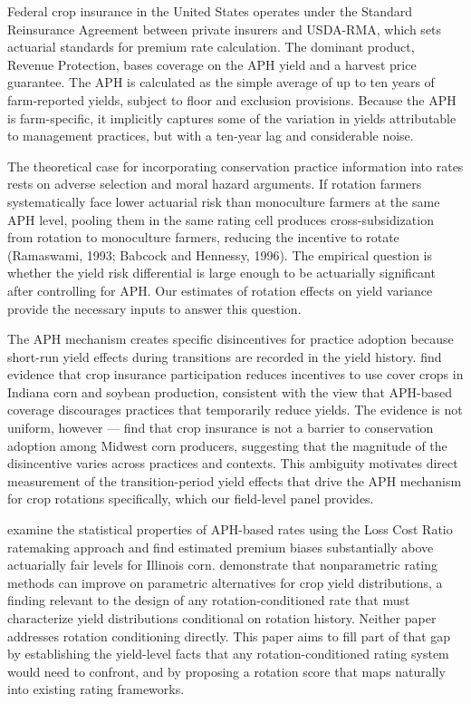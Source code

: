 \documentclass[11pt,letterpaper]{article}
\theoremstyle{remark}
\theoremstyle{plain}
\theoremstyle{definition}
\begin{document}
Federal crop insurance in the United States operates under the Standard Reinsurance Agreement between private insurers and USDA-RMA, which sets actuarial standards for premium rate calculation. The dominant product, Revenue Protection, bases coverage on the APH yield and a harvest price guarantee. The APH is calculated as the simple average of up to ten years of farm-reported yields, subject to floor and exclusion provisions. Because the APH is farm-specific, it implicitly captures some of the variation in yields attributable to management practices, but with a ten-year lag and considerable noise.

The theoretical case for incorporating conservation practice information into rates rests on adverse selection and moral hazard arguments. If rotation farmers systematically face lower actuarial risk than monoculture farmers at the same APH level, pooling them in the same rating cell produces cross-subsidization from rotation to monoculture farmers, reducing the incentive to rotate (Ramaswami, 1993; Babcock and Hennessy, 1996). The empirical question is whether the yield risk differential is large enough to be actuarially significant after controlling for APH. Our estimates of rotation effects on yield variance provide the necessary inputs to answer this question.

The APH mechanism creates specific disincentives for practice adoption because short-run yield effects during transitions are recorded in the yield history. \cite{Connor2022} find evidence that crop insurance participation reduces incentives to use cover crops in Indiana corn and soybean production, consistent with the view that APH-based coverage discourages practices that temporarily reduce yields. The evidence is not uniform, however — \cite{Fleckenstein2020} find that crop insurance is not a barrier to conservation adoption among Midwest corn producers, suggesting that the magnitude of the disincentive varies across practices and contexts. This ambiguity motivates direct measurement of the transition-period yield effects that drive the APH mechanism for crop rotations specifically, which our field-level panel provides.

\cite{Woodard2011} examine the statistical properties of APH-based rates using the Loss Cost Ratio ratemaking approach and find estimated premium biases substantially above actuarially fair levels for Illinois corn. \cite{Ker2000} demonstrate that nonparametric rating methods can improve on parametric alternatives for crop yield distributions, a finding relevant to the design of any rotation-conditioned rate that must characterize yield distributions conditional on rotation history. Neither paper addresses rotation conditioning directly. This paper aims to fill part of that gap by establishing the yield-level facts that any rotation-conditioned rating system would need to confront, and by proposing a rotation score that maps naturally into existing rating frameworks.
\end{document}
